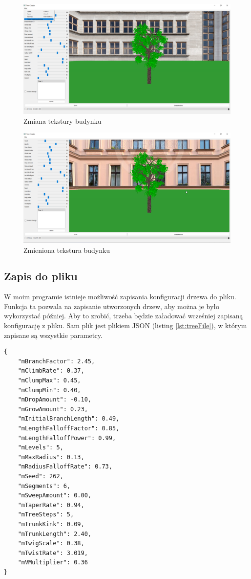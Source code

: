 \documentclass[a4paper,twoside,12pt]{report}
\begin{document}
\begin{figure}[H]
	\centering\includegraphics[width=15.5cm]{grafika/program/texture4.png}
	\caption{Zmiana tekstury budynku}
    \label{fig:choosebuild}
\end{figure}

\begin{figure}[H]
	\centering\includegraphics[width=15.5cm]{grafika/program/texture5.png}
	\caption{Zmieniona tekstura budynku}
    \label{fig:choosebuild2}
\end{figure}

\subsection{Zapis do pliku}

W moim programie istnieje możliwość zapisania konfiguracji drzewa do pliku. 
Funkcja ta pozwala na zapisanie utworzonych drzew, aby można je było 
wykorzystać później. Aby to zrobić, trzeba będzie 
załadować wcześniej zapisaną konfigurację z pliku.
Sam plik jest plikiem JSON (listing \ref{lst:treeFile}), w którym zapisane są wszystkie parametry.

\begin{lstlisting}[caption={Zawartość pliku drzewa}, label={lst:treeFile}]
{
    "mBranchFactor": 2.45,
    "mClimbRate": 0.37,
    "mClumpMax": 0.45,
    "mClumpMin": 0.40,
    "mDropAmount": -0.10,
    "mGrowAmount": 0.23,
    "mInitialBranchLength": 0.49,
    "mLengthFalloffFactor": 0.85,
    "mLengthFalloffPower": 0.99,
    "mLevels": 5,
    "mMaxRadius": 0.13,
    "mRadiusFalloffRate": 0.73,
    "mSeed": 262,
    "mSegments": 6,
    "mSweepAmount": 0.00,
    "mTaperRate": 0.94,
    "mTreeSteps": 5,
    "mTrunkKink": 0.09,
    "mTrunkLength": 2.40,
    "mTwigScale": 0.38,
    "mTwistRate": 3.019,
    "mVMultiplier": 0.36
}
\end{lstlisting}
\end{document}
